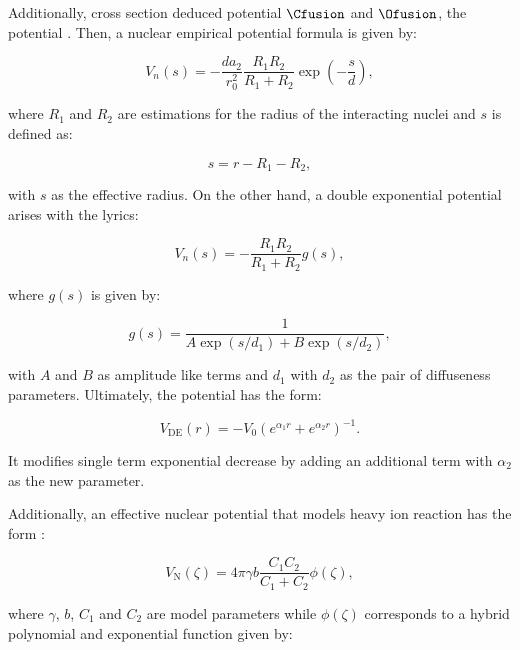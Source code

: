 \documentclass[openany]{book}
\begin{document}
Additionally, cross section deduced potential  $\Cfusion$ and $\Ofusion$, the potential \cite{bass_1977}. Then, a nuclear empirical potential formula is given by: 

\begin{equation}\label{potential_empirical_exp1}
	V_n(s) = - \frac{da_2}{r^2_0} \frac{R_1R_2}{R_1 + R_2} 	\exp \left( - \frac{s}{d}\right),
\end{equation}

where $R_1$ and $R_2$ are estimations for the radius of the interacting nuclei  and $s$ is defined as: 

\begin{equation}\label{potential_empirical_exp1_s}
	s = r - R_1 - R_2,
\end{equation}

with $s$ as the effective radius. On the other hand, a double exponential potential arises with the lyrics:

\begin{equation}\label{potential_empirical_exp11}
	V_n(s) = - \frac{R_1R_2}{R_1 + R_2} g(s),
\end{equation}

where $g(s)$ is given by:

\begin{equation}\label{potential_empirical_exp11_g}
	g(s) = \frac{1}{A\exp (s/d_1) + B\exp(s/d_2)},
\end{equation}

with $A$ and $B$ as amplitude like terms and $d_1$ with $d_2$ as the pair of diffuseness parameters. Ultimately, the potential has the form:

\begin{equation} \label{eq:potential_doubleExponential}
	V_{\mathrm{DE}}(r) = - V_0 \left(e^{\alpha_1 r} + e^{\alpha_2 r} \right)^{-1}.
\end{equation}

It modifies single term exponential decrease by adding an additional term with $\alpha_2$ as the new parameter.

Additionally, an effective nuclear potential that models heavy ion reaction has the form \cite{koyuncu_soylu_2018}: 

\begin{equation}\label{eq:middleFusion_analytical_proximity}
	V_{\mathrm{N}}(\zeta) = 4\pi\gamma b \frac{C_1C_2}{C_1 + C_2} \phi(\zeta),
\end{equation}

where $\gamma$, $b$, $C_1$ and $C_2$ are model parameters while $\phi(\zeta)$ corresponds to a hybrid  polynomial and exponential function given by:
\end{document}

